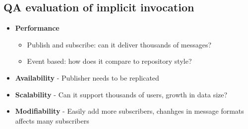 \documentclass[12pt]{book}
\begin{document}
\subsection{QA evaluation of implicit invocation}

\begin{itemize}
    \item \textbf{Performance}
    \begin{itemize}
        \item Publish and subscribe: can it deliver thousands of messages?
        \item Event based: how does it compare to repository style?
    \end{itemize} 
    
    \item \textbf{Availability} - Publisher needs to be replicated
    \item \textbf{Scalability} - Can it support thousands of users, growth in data size?
    \item \textbf{Modifiability} - Easily add more subscribers, chanhges in message formats affects many subscribers
\end{itemize}
\end{document}

